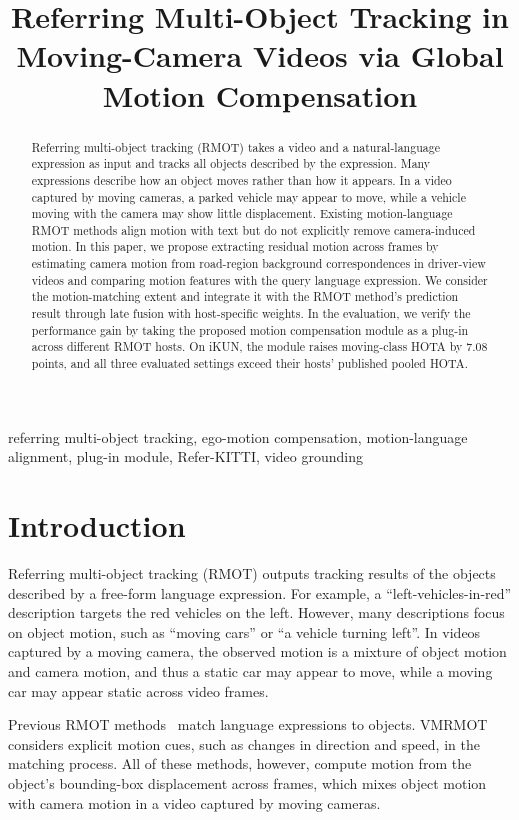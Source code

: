 \documentclass{article}
\title{Referring Multi-Object Tracking in Moving-Camera Videos via Global Motion Compensation}
\begin{document}
\ninept
%
\maketitle
%
\begin{abstract}
  Referring multi-object tracking (RMOT) takes a video and a natural-language expression as input and tracks all objects described by the expression. Many expressions describe how an object moves rather than how it appears. In a video captured by moving cameras, a parked vehicle may appear to move, while a vehicle moving with the camera may show little displacement. Existing motion-language RMOT methods align motion with text but do not explicitly remove camera-induced motion. In this paper, we propose extracting residual motion across frames by estimating camera motion from road-region background correspondences in driver-view videos and comparing motion features with the query language expression. We consider the motion-matching extent and integrate it with the RMOT method's prediction result through late fusion with host-specific weights. In the evaluation, we verify the performance gain by taking the proposed motion compensation module as a plug-in across different RMOT hosts. On iKUN, the module raises moving-class HOTA by $7.08$ points, and all three evaluated settings exceed their hosts' published pooled HOTA.
\end{abstract}
%
\begin{keywords}
  referring multi-object tracking, ego-motion compensation, motion-language alignment, plug-in module, Refer-KITTI, video grounding
\end{keywords}


\section{Introduction}
\label{sec:intro}
Referring multi-object tracking (RMOT) outputs tracking results of the objects described by a free-form language expression. For example, a \enquote{left-vehicles-in-red} description targets the red vehicles on the left. However, many descriptions focus on object motion, such as \enquote{moving cars} or \enquote{a vehicle turning left}. In videos captured by a moving camera, the observed motion is a mixture of object motion and camera motion, and thus a static car may appear to move, while a moving car may appear static across video frames.

Previous RMOT methods~\cite{transrmot,ikun,flexhook} match language expressions to objects.  VMRMOT~\cite{vmrmot} considers explicit motion cues, such as changes in direction and speed, in the matching process. All of these methods, however, compute motion from the object's bounding-box displacement across frames, which mixes object motion with camera motion in a video captured by moving cameras.
\end{document}

